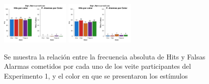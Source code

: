 \documentclass[a4paper ]{article}
\begin{document}
\begin{figure}[th]
\includegraphics[width=0.3\textwidth]{Figures/Color_Exp1_P19} \includegraphics[width=0.3\textwidth]{Figures/Color_Exp1_P20} 
\caption[Hits y Falsas Alarmas obtenidos por Color; Experimento 1]{Se muestra la relación entre la frecuencia absoluta de Hits y Falsas Alarmas cometidos por cada uno de los veite participantes del Experimento 1, y el color en que se presentaron los estímulos}
\label{fig:Color_E1}
\end{figure}
\end{document}
